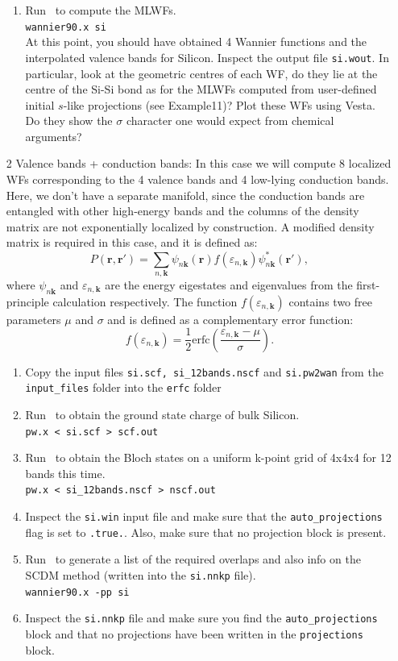 \documentclass[a4paper,11pt,twoside]{article}
\begin{document}
\begin{itemize}
\begin{enumerate}
    \item Run \wannier\ to compute the MLWFs.\\
    {\tt wannier90.x si}\\
    At this point, you should have obtained 4 Wannier functions and the interpolated valence bands for Silicon. Inspect the output file {\tt si.wout}. In particular, look at the geometric centres of each WF, do they lie at the centre of the Si-Si bond as for the MLWFs computed from user-defined initial $s$-like projections (see Example11)?
    Plot these WFs using Vesta. Do they show the $\sigma$ character one would expect from chemical arguments?
  \end{enumerate}
  \item[2]{Valence bands + conduction bands: In this case we will compute 8 localized WFs corresponding to the 4 valence bands and 4 low-lying conduction bands. Here, we don't have a separate manifold, since the conduction bands are entangled with other high-energy bands and the columns of the density matrix are not exponentially localized by construction. A modified density matrix is required in this case\cite{LinLin-ArXiv2017}, and it is defined as: $$P(\mathbf{r},\mathbf{r}') = \sum_{n,\mathbf{k}} \psi_{n\mathbf{k}}(\mathbf{r})f(\varepsilon_{n,\mathbf{k}})\psi_{n\mathbf{k}}^\ast(\mathbf{r}'),$$
  where $\psi_{n\mathbf{k}}$ and $\varepsilon_{n,\mathbf{k}}$ are the energy eigestates and eigenvalues from the first-principle calculation respectively. The function $f(\varepsilon_{n,\mathbf{k}})$ contains two free parameters $\mu$ and $\sigma$ and is defined as a complementary error function: $$f(\varepsilon_{n,\mathbf{k}}) = \frac{1}{2}\mathrm{erfc}\left(\frac{\varepsilon_{n,\mathbf{k}} - \mu}{\sigma}\right).$$ }
  \begin{enumerate}
    \item Copy the input files {\tt si.scf, si\_12bands.nscf} and {\tt si.pw2wan} from the {\tt input\_files} folder into the {\tt erfc} folder
    \item Run \pwscf\ to obtain the ground state charge of bulk Silicon. \\
    {\tt pw.x < si.scf > scf.out}

    \item Run \pwscf\ to obtain the Bloch states on a uniform k-point grid of 4x4x4 for 12 bands this time. \\
    {\tt pw.x < si\_12bands.nscf > nscf.out}
    
    \item Inspect the {\tt si.win} input file and make sure that the {\tt auto\_projections} flag is set to {\tt .true.}. Also, make sure that no projection block is present.
    \item Run \wannier\ to generate a list of the required overlaps and also info on the SCDM method (written
    into the {\tt si.nnkp} file).\\ 
    {\tt wannier90.x -pp si}
    \item Inspect the {\tt si.nnkp} file and make sure you find the {\tt auto\_projections} block and that no projections have been written in the {\tt projections} block.


\end{enumerate}
\end{itemize}
\end{document}
